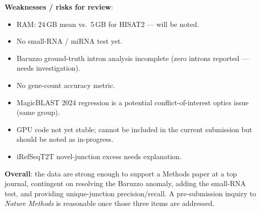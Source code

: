 \documentclass[11pt]{article}
\begin{document}
\textbf{Weaknesses / risks for review}:
\begin{itemize}
  \item RAM: 24\,GB mean vs.\ 5\,GB for HISAT2 — will be noted.
  \item No small-RNA / miRNA test yet.
  \item Baruzzo ground-truth intron analysis incomplete (zero introns
    reported — needs investigation).
  \item No gene-count accuracy metric.
  \item MagicBLAST 2024 regression is a potential conflict-of-interest
    optics issue (same group).
  \item GPU code not yet stable; cannot be included in the current
    submission but should be noted as in-progress.
  \item iRefSeqT2T novel-junction excess needs explanation.
\end{itemize}

\textbf{Overall}: the data are strong enough to support a Methods paper
at a top journal, contingent on resolving the Baruzzo anomaly, adding
the small-RNA test, and providing unique-junction precision/recall.
A pre-submission inquiry to \emph{Nature Methods} is reasonable once
those three items are addressed.
\end{document}

